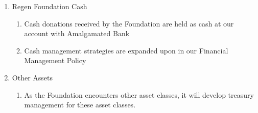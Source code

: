 \documentclass{article}
\begin{document}
\begin{enumerate}
\begin{enumerate}
\end{enumerate}
\item Regen Foundation Cash
\begin{enumerate}
\item Cash donations received by the Foundation are held as cash at our account with Amalgamated Bank
\item Cash management strategies are expanded upon in our Financial Management Policy
\end{enumerate}
\item Other Assets
\begin{enumerate}
\item As the Foundation encounters other asset classes, it will develop treasury management for these asset classes.
\end{enumerate}
\end{enumerate}
\end{document}

